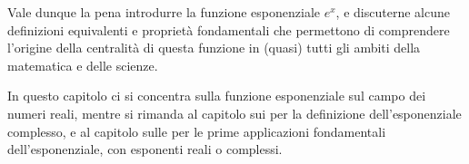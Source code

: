 \documentclass[letterpaper,10pt,italian]{jupyterBook}
\begin{document}
\sphinxAtStartPar
Vale dunque la pena introdurre la funzione esponenziale \(e^x\), e discuterne alcune definizioni equivalenti e proprietà fondamentali che permettono di comprendere l’origine della centralità di questa funzione in (quasi) tutti gli ambiti della matematica e delle scienze.

\sphinxAtStartPar
In questo capitolo ci si concentra sulla funzione esponenziale sul campo dei numeri reali, mentre si rimanda al capitolo sui {\hyperref[\detokenize{ch/algebra/complex-algebra:math-hs-algebra-complex}]{}} per la definizione dell’esponenziale complesso, e al capitolo sulle {\hyperref[\detokenize{ch/ode:ode-hs}]{}} per le prime applicazioni fondamentali dell’esponenziale, con esponenti reali o complessi.
\end{document}
